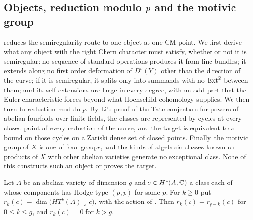 \subsection{Objects, reduction modulo $p$ and the motivic group}
\label{ssec:mumfordobject}

 reduces the semiregularity route to one object at
one CM point. We first derive what any object with the right Chern character
must satisfy, whether or not it is semiregular: no sequence of standard
operations produces it from line bundles; it extends along no first order
deformation of $D^{b}(Y)$ other than the direction of the curve; if it is
semiregular, it splits only into summands with no $\operatorname{Ext}^{2}$ between them;
and its self-extensions are large in every degree, with an odd part that the
Euler characteristic forces beyond what Hochschild cohomology supplies. We
then turn to reduction modulo $p$. By Li's proof of the Tate conjecture for
powers of abelian fourfolds over finite fields, the classes are represented
by cycles at every closed point of every reduction of the curve, and the
target is equivalent to a bound on those cycles on a Zariski dense set of
closed points. Finally, the motivic group of $X$ is one of four groups, and
the kinds of algebraic classes known on products of $X$ with other abelian
varieties generate no exceptional class. None of this constructs such an
object or proves the target.

\begin{lemma}\label{lem:rankduality}
Let $A$ be an abelian variety of dimension $g$ and $c\in H^{*}(A,\mathbb{C})$ a class
each of whose components has Hodge type $(p,p)$ for some $p$. For $k\ge0$ put
$r_{k}(c)=\dim\bigl(HT^{k}(A)\lrcorner\,c\bigr)$, with the action of
. Then $r_{k}(c)=r_{g-k}(c)$ for $0\le k\le g$, and
$r_{k}(c)=0$ for $k>g$.
\end{lemma}

